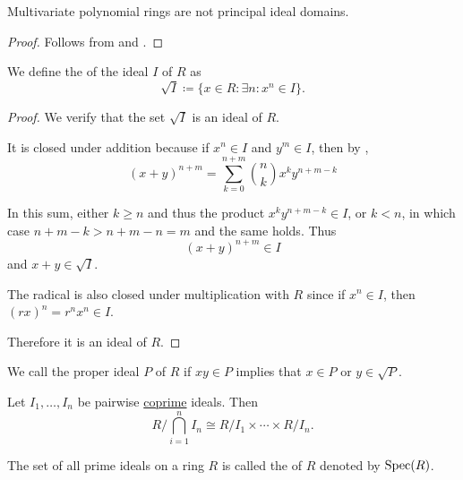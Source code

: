 \begin{corollary}\label{thm:multivariate_polynomial_rings_are_not_pid}
  Multivariate polynomial rings are not principal ideal domains.
\end{corollary}
\begin{proof}
  Follows from  and .
\end{proof}

\begin{definition}\label{def:radical_ideal}\mcite\cite[15]{Коцев2016}
  We define the  of the ideal \( I \) of \( R \) as
  \begin{equation*}
    \sqrt I \coloneqq \{ x \in R \colon \exists n: x^n \in I \}.
  \end{equation*}
\end{definition}
\begin{proof}
  We verify that the set \( \sqrt I \) is an ideal of \( R \).

  It is closed under addition because if \( x^n \in I \) and \( y^m \in I \), then by ,
  \begin{equation*}
    (x + y)^{n+m}
    =
    \sum_{k=0}^{n+m} \binom n k x^k y^{n+m-k}
  \end{equation*}

  In this sum, either \( k \geq n \) and thus the product \( x^k y^{n+m-k} \in I \), or \( k < n \), in which case \( n + m - k > n + m - n = m \) and the same holds. Thus
  \begin{equation*}
    (x + y)^{n+m} \in I
  \end{equation*}
  and \( x + y \in \sqrt I \).

  The radical is also closed under multiplication with \( R \) since if \( x^n \in I \), then \( (rx)^n = r^n x^n \in I \).

  Therefore it is an ideal of \( R \).
\end{proof}

\begin{definition}\label{def:primary_ring_ideal}\mcite\cite[74]{Коцев2016}
  We call the proper ideal \( P \) of \( R \)  if \( xy \in P \) implies that \( x \in P \) or \( y \in \sqrt P \).
\end{definition}

\begin{theorem}\label{thm:chinese_remained_theorem}\mcite\cite[thm. 8.27]{Knapp2016BAlg}
  Let \( I_1, \ldots, I_n \) be pairwise \hyperref[def:coprime_ring_ideals]{coprime} ideals. Then
  \begin{equation*}
    R / \bigcap_{i=1}^n I_n \cong R / I_1 \times \cdots \times R / I_n.
  \end{equation*}
\end{theorem}

\begin{definition}\label{def:spectrum_of_ring}
  The set of all prime ideals on a ring \( R \) is called the  of \( R \) denoted by \( \operatorname{Spec}(R) \).
\end{definition}
